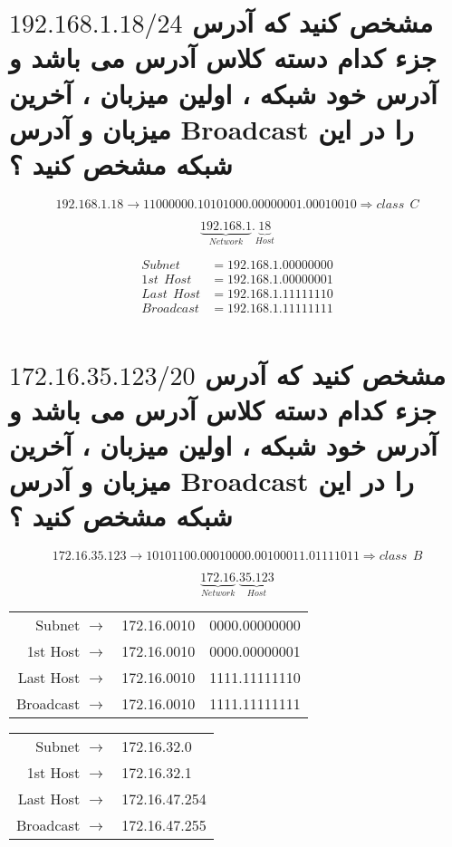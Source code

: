 \documentclass{article}
\begin{document}
\newpage

\section{مشخص کنید که آدرس 
$
192.168.1.18/24
$
جزء کدام دسته کلاس آدرس می باشد و آدرس خود شبکه ، اولین میزبان ، آخرین میزبان و آدرس Broadcast را در این شبکه مشخص کنید ؟
}


$$
192.168.1.18 \to 11000000.10101000.00000001.00010010 \Rightarrow class \:\: C
$$

$$
\underbrace{192.168.1}_{Network}.\underbrace{18}_{Host}
$$


\begin{align*}
Subnet &= 192.168.1.00000000 \\
1st \:\: Host &= 192.168.1.00000001 \\
Last \:\: Host &= 192.168.1.11111110 \\
Broadcast &= 192.168.1.11111111 \\
\end{align*}





\section{مشخص کنید که آدرس 
$
172.16.35.123/20
$
جزء کدام دسته کلاس آدرس می باشد و آدرس خود شبکه ، اولین میزبان ، آخرین میزبان و آدرس Broadcast را در این شبکه مشخص کنید ؟
}


$$
172.16.35.123 \to 10101100.00010000.00100011.01111011 \Rightarrow class \:\: B
$$


$$
\underbrace{172.16}_{Network}.\underbrace{35.123}_{Host}
$$


\begin{latin}
\begin{center}
  \begin{tabular}{ r  r | l  }
    Subnet $\to$ & 172.16.0010 & 0000.00000000 \\
    1st Host $\to$ & 172.16.0010 & 0000.00000001 \\
    Last Host $\to$ & 172.16.0010 & 1111.11111110 \\
    Broadcast $\to$ & 172.16.0010 & 1111.11111111 \\
  \end{tabular}
\end{center}
\end{latin}


\begin{latin}
\begin{center}
  \begin{tabular}{ r  l   }
    Subnet $\to$ & 172.16.32.0  \\
    1st Host $\to$ & 172.16.32.1  \\
    Last Host $\to$ & 172.16.47.254 \\
    Broadcast $\to$ & 172.16.47.255 \\
  \end{tabular}
\end{center}
\end{latin}
\end{document}
